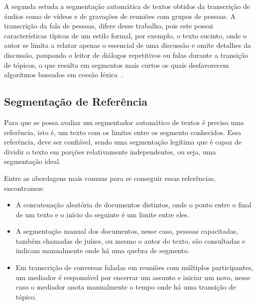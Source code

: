 %
%
A segunda estuda a segmentação automática de textos obtidos da transcrição de áudios como de vídeos e de gravações de reuniões com grupos de pessoas. 
A transcrição da fala de pessoas, difere desse trabalho, pois este possui características típicas de um estilo formal, por exemplo, o texto sucinto, onde o autor se limita a relatar apenas o essencial de uma discussão e omite detalhes da discussão, poupando o leitor de diálogos repetitivos ou falas durante a transição de tópicos, o que resulta em segmentos mais curtos os quais desfavorecem algoritmos baseados em coesão léxica~\cite{Choi2000}. 




\subsection{Segmentação de Referência}


Para que se possa avaliar um segmentador automático de textos é preciso uma referência, isto é, um texto com os limites entre os segmento conhecidos. Essa referência, deve ser confiável, sendo uma segmentação legítima que é capaz de dividir o texto em porções relativamente independentes, ou seja, uma segmentação ideal.



Entre as abordagens mais comuns para se conseguir essas referências, encontramos: 

\begin{itemize}

\item A concatenação aleatória de documentos distintos, onde o ponto entre o final de um texto e o início do seguinte é um limite entre eles. 

\item A segmentação manual dos documentos, nesse caso, pessoas capacitadas, também chamadas de juízes, ou mesmo o autor do texto, são consultadas e indicam manualmente onde há uma quebra de segmento. 
\item Em transcrição de conversas faladas em reuniões com múltiplos participantes, um mediador é responsável por encerrar um assunto e iniciar um novo, nesse caso o mediador anota manualmente o tempo onde há uma transição de tópico. 

\end{itemize}

